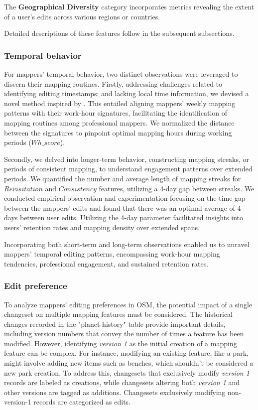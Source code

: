 \documentclass[manuscript,screen,review]{acmart}
\begin{document}
The \textbf{Geographical Diversity} category incorporates metrics revealing the extent of a user's edits across various regions or countries.

Detailed descriptions of these features follow in the subsequent subsections.

\subsubsection{Temporal behavior}

For mappers' temporal behavior, two distinct observations were leveraged to discern their mapping routines. Firstly, addressing challenges related to identifying editing timestamps; and lacking local time information, we devised a novel method inspired by \cite{Veselovsky22}. This entailed aligning mappers' weekly mapping patterns with their work-hour signatures, facilitating the identification of mapping routines among professional mappers. We normalized the distance between the signatures to pinpoint optimal mapping hours during working periods ($Wh\_score$).

Secondly, we delved into longer-term behavior, constructing mapping streaks, or periods of consistent mapping, to understand engagement patterns over extended periods. We quantified the number and average length of mapping streaks for $Revisitation$ and $Consistency$ features, utilizing a 4-day gap between streaks. We conducted empirical observation and experimentation focusing on the time gap between the mappers’ edits and found that there was an optimal average of 4 days between user edits. Utilizing the 4-day parameter facilitated insights into users' retention rates and mapping density over extended spans.

Incorporating both short-term and long-term observations enabled us to unravel mappers' temporal editing patterns, encompassing work-hour mapping tendencies, professional engagement, and sustained retention rates.

\subsubsection{Edit preference}

To analyze mappers' editing preferences in OSM, the potential impact of a single changeset on multiple mapping features must be considered. The historical changes recorded in the "planet-history" table provide important details, including version numbers that convey the number of times a feature has been modified. However, identifying \textit{version 1} as the initial creation of a mapping feature can be complex. For instance, modifying an existing feature, like a park, might involve adding new items such as benches, which shouldn't be considered a new park creation. To address this, changesets that exclusively modify \textit{version 1} records are labeled as creations, while changesets altering both \textit{version 1} and other versions are tagged as additions. Changesets exclusively modifying non-version-1 records are categorized as edits.  
\end{document}
